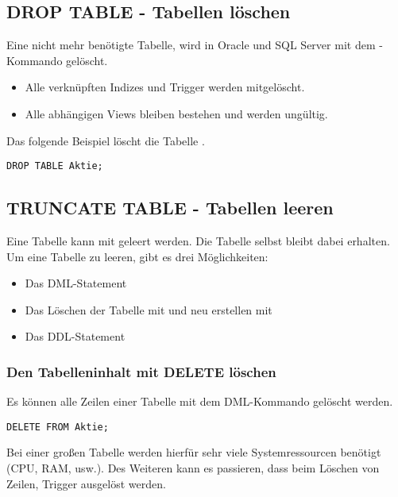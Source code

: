       \subsection{DROP TABLE - Tabellen löschen}
        Eine nicht mehr benötigte Tabelle, wird in Oracle und SQL Server mit dem -Kommando gelöscht.
        \begin{itemize}
          \item Alle verknüpften Indizes und Trigger werden mitgelöscht.
          \item Alle abhängigen Views bleiben bestehen und werden ungültig.
        \end{itemize}
        Das folgende Beispiel löscht die Tabelle .
        \begin{lstlisting}[language=oracle_sql,caption={Eine Tabelle löschen},label=sql08_21]
DROP TABLE Aktie;
        \end{lstlisting}
      \subsection{TRUNCATE TABLE - Tabellen leeren}
        Eine Tabelle kann mit  geleert werden. Die Tabelle selbst bleibt dabei erhalten. Um eine Tabelle zu leeren, gibt es drei Möglichkeiten:
        \begin{itemize}
          \item Das DML-Statement 
          \item Das Löschen der Tabelle mit  und neu erstellen mit 
          \item Das DDL-Statement 
        \end{itemize}
        \subsubsection{Den Tabelleninhalt mit DELETE löschen}
          Es können alle Zeilen einer Tabelle mit dem DML-Kommando  gelöscht werden.
          \begin{lstlisting}[language=oracle_sql,caption={Zeilen mit DELETE löschen},label=sql08_22]
DELETE FROM Aktie;
          \end{lstlisting}
          Bei einer großen Tabelle werden hierfür sehr viele
          Systemressourcen benötigt (CPU, RAM, usw.). Des Weiteren kann es
          passieren, dass beim Löschen von Zeilen, Trigger ausgelöst werden.

